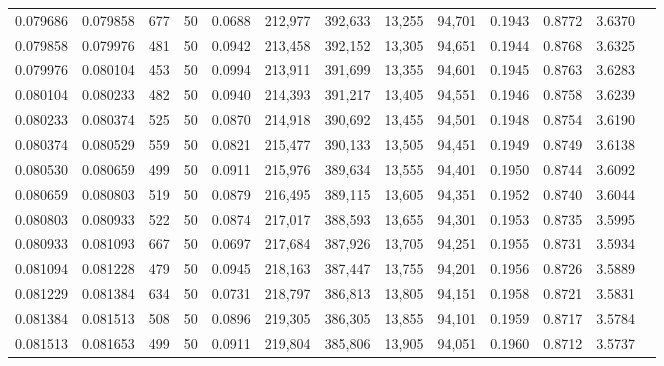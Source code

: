 \begin{tabular}{rrrrrrrrrrrrr}
0.079686 & 0.079858 &   677 &  50 &                                     0.0688 & 212,977 & 392,633 &  13,255 &  94,701 & 0.1943 & 0.8772 & 3.6370 \\
0.079858 & 0.079976 &   481 &  50 &                                     0.0942 & 213,458 & 392,152 &  13,305 &  94,651 & 0.1944 & 0.8768 & 3.6325 \\
0.079976 & 0.080104 &   453 &  50 &                                     0.0994 & 213,911 & 391,699 &  13,355 &  94,601 & 0.1945 & 0.8763 & 3.6283 \\
0.080104 & 0.080233 &   482 &  50 &                                     0.0940 & 214,393 & 391,217 &  13,405 &  94,551 & 0.1946 & 0.8758 & 3.6239 \\
0.080233 & 0.080374 &   525 &  50 &                                     0.0870 & 214,918 & 390,692 &  13,455 &  94,501 & 0.1948 & 0.8754 & 3.6190 \\
0.080374 & 0.080529 &   559 &  50 &                                     0.0821 & 215,477 & 390,133 &  13,505 &  94,451 & 0.1949 & 0.8749 & 3.6138 \\
0.080530 & 0.080659 &   499 &  50 &                                     0.0911 & 215,976 & 389,634 &  13,555 &  94,401 & 0.1950 & 0.8744 & 3.6092 \\
0.080659 & 0.080803 &   519 &  50 &                                     0.0879 & 216,495 & 389,115 &  13,605 &  94,351 & 0.1952 & 0.8740 & 3.6044 \\
0.080803 & 0.080933 &   522 &  50 &                                     0.0874 & 217,017 & 388,593 &  13,655 &  94,301 & 0.1953 & 0.8735 & 3.5995 \\
0.080933 & 0.081093 &   667 &  50 &                                     0.0697 & 217,684 & 387,926 &  13,705 &  94,251 & 0.1955 & 0.8731 & 3.5934 \\
0.081094 & 0.081228 &   479 &  50 &                                     0.0945 & 218,163 & 387,447 &  13,755 &  94,201 & 0.1956 & 0.8726 & 3.5889 \\
0.081229 & 0.081384 &   634 &  50 &                                     0.0731 & 218,797 & 386,813 &  13,805 &  94,151 & 0.1958 & 0.8721 & 3.5831 \\
0.081384 & 0.081513 &   508 &  50 &                                     0.0896 & 219,305 & 386,305 &  13,855 &  94,101 & 0.1959 & 0.8717 & 3.5784 \\
0.081513 & 0.081653 &   499 &  50 &                                     0.0911 & 219,804 & 385,806 &  13,905 &  94,051 & 0.1960 & 0.8712 & 3.5737 \\

\end{tabular}
